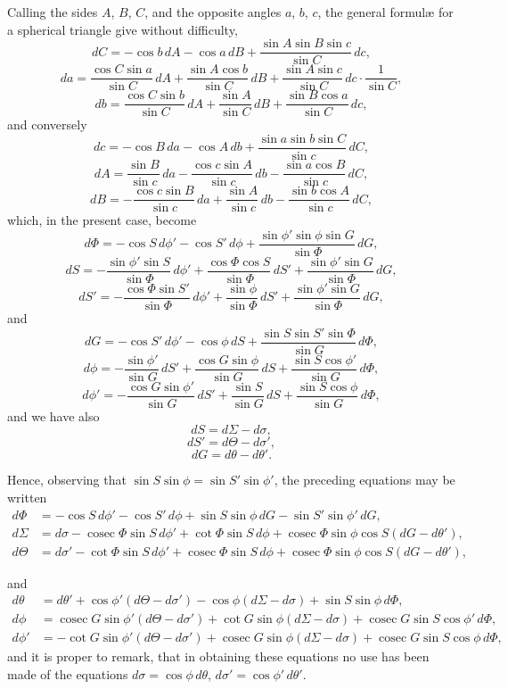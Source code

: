 \documentclass[11pt]{article}
\begin{document}
\bigskip
{} Calling the sides $A$, $B$, $C$, and the opposite angles $a$, $b$, $c$, the general formul\ae{} for a spherical triangle give without difficulty,
\[
dC = -\cos b\,dA - \cos a\,dB + \frac{\sin A\sin B\sin c}{\sin C}\,dc,
\]
\[
da = \frac{\cos C\sin a}{\sin C}\,dA + \frac{\sin A\cos b}{\sin C}\,dB + \frac{\sin A\sin c}{\sin C}\,dc \cdot \frac{1}{\sin C},
\]
\[
db = \frac{\cos C\sin b}{\sin C}\,dA + \frac{\sin A}{\sin C}\,dB + \frac{\sin B\cos a}{\sin C}\,dc,
\]
and conversely
\[
dc = -\cos B\,da - \cos A\,db + \frac{\sin a\sin b\sin C}{\sin c}\,dC,
\]
\[
dA = \frac{\sin B}{\sin c}\,da - \frac{\cos c\sin A}{\sin c}\,db - \frac{\sin a\cos B}{\sin c}\,dC,
\]
\[
dB = -\frac{\cos c\sin B}{\sin c}\,da + \frac{\sin A}{\sin c}\,db - \frac{\sin b\cos A}{\sin c}\,dC,
\]
which, in the present case, become
\[
d\Phi = -\cos S\,d\phi' - \cos S'\,d\phi + \frac{\sin\phi'\sin\phi\sin G}{\sin\Phi}\,dG,
\]
\[
dS = -\frac{\sin\phi'\sin S}{\sin\Phi}\,d\phi' + \frac{\cos\Phi\cos S}{\sin\Phi}\,dS' + \frac{\sin\phi'\sin G}{\sin\Phi}\,dG,
\]
\[
dS' = -\frac{\cos\Phi\sin S'}{\sin\Phi}\,d\phi' + \frac{\sin\phi}{\sin\Phi}\,dS' + \frac{\sin\phi'\sin G}{\sin\Phi}\,dG,
\]
and
\[
dG = -\cos S'\,d\phi' - \cos\phi\,dS + \frac{\sin S\sin S'\sin\Phi}{\sin G}\,d\Phi,
\]
\[
d\phi = -\frac{\sin\phi'}{\sin G}\,dS' + \frac{\cos G\sin\phi}{\sin G}\,dS + \frac{\sin S\cos\phi'}{\sin G}\,d\Phi,
\]
\[
d\phi' = -\frac{\cos G\sin\phi'}{\sin G}\,dS' + \frac{\sin S}{\sin G}\,dS + \frac{\sin S\cos\phi}{\sin G}\,d\Phi,
\]
and we have also
\[
dS = d\Sigma - d\sigma,
\]
\[
dS' = d\Theta - d\sigma',
\]
\[
dG = d\theta - d\theta'.
\]

\medskip
\noindent Hence, observing that $\sin S\sin\phi = \sin S'\sin\phi'$, the preceding equations may be written
\begin{align*}
d\Phi &= -\cos S\,d\phi' - \cos S'\,d\phi + \sin S\sin\phi\,dG - \sin S'\sin\phi'\,dG, \\
d\Sigma &= d\sigma - \operatorname{cosec}\Phi\sin S\,d\phi' + \cot\Phi\sin S\,d\phi + \operatorname{cosec}\Phi\sin\phi\cos S(dG - d\theta'), \\
d\Theta &= d\sigma' - \cot\Phi\sin S\,d\phi' + \operatorname{cosec}\Phi\sin S\,d\phi + \operatorname{cosec}\Phi\sin\phi\cos S(dG - d\theta'),
\end{align*}

\bigskip
{} and
\begin{align*}
d\theta &= d\theta' + \cos\phi'(d\Theta - d\sigma') - \cos\phi(d\Sigma - d\sigma) + \sin S\sin\phi\,d\Phi, \\
d\phi &= \operatorname{cosec} G\sin\phi'(d\Theta - d\sigma') + \cot G\sin\phi(d\Sigma - d\sigma) + \operatorname{cosec} G\sin S\cos\phi'\,d\Phi, \\
d\phi' &= -\cot G\sin\phi'(d\Theta - d\sigma') + \operatorname{cosec} G\sin\phi(d\Sigma - d\sigma) + \operatorname{cosec} G\sin S\cos\phi\,d\Phi,
\end{align*}
and it is proper to remark, that in obtaining these equations no use has been made of the equations $d\sigma=\cos\phi\,d\theta$, $d\sigma' = \cos\phi'\,d\theta'$.
\end{document}
